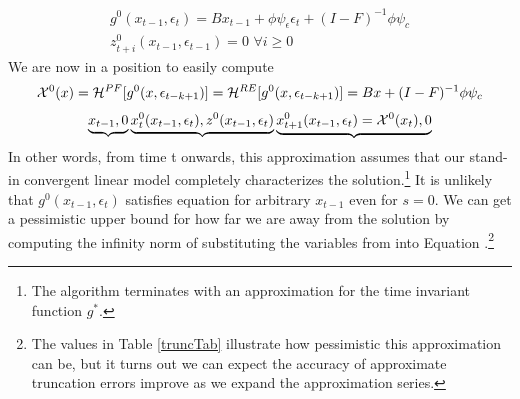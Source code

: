 \documentclass[12pt]{article}
\begin{document}
 \begin{gather}
 g^0(x_{t-1},\epsilon_{t})=  
B x_{t-1}+ \phi \psi_\epsilon\epsilon_{t} +
 (I - F)^{-1} \phi \psi_c\\ \label{firstIter}
z^{0}_{t+i}(x_{t-1},\epsilon_{t-1})=0 \,\, \forall i \ge 0
 \end{gather}
We are now in a position to easily compute 
 \begin{gather}
\mathcal{X}^{0}(x)=\mathcal{H}^{PF}[g^{0}(x,\epsilon_{t-k+1})]=
\mathcal{H}^{RE}[g^{0}(x,\epsilon_{t-k+1})]= 
B x+  (I - F)^{-1} \phi \psi_c
 \end{gather}
\begin{gather}
\underbrace{x_{t-1},0} 
\underbrace{x^{0}_t(x_{t-1},\epsilon_t),z^{0}(x_{t-1},\epsilon_t)}
\underbrace{x^{0}_{t+1}(x_{t-1},\epsilon_t)=\mathcal{X}^{0}(x_{t}),0}
\end{gather}
In other words, from time t onwards, this approximation assumes 
that our stand-in
 convergent linear model completely characterizes the solution.\footnote{
The algorithm terminates with an approximation for 
the time invariant function $g^\ast$.}  It is unlikely that $g^0(x_{t-1},\epsilon_{t})$
satisfies equation  for arbitrary $x_{t-1}$ even for $s=0$.
We can get a pessimistic upper bound for how far we are away from the solution 
by computing the infinity norm of substituting the variables from into Equation .\footnote{The values in Table \ref{truncTab} illustrate how
pessimistic this approximation can be, but it turns out we can expect the accuracy of  approximate truncation errors improve as we expand the approximation series.}
\end{document}
